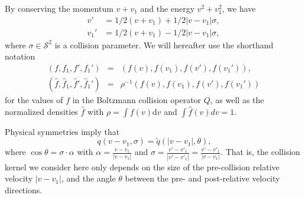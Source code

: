 \documentclass[12pt]{amsart}
\newcommand{\cS}{\mathcal S} \newcommand{\cT}{\mathcal T}
\newcommand{\rd}{\mathrm{d}}
\begin{document}
By conserving the momentum $v+v_1$ and the energy $v^2 + v_1^2$, we have
\begin{equation}\label{BoltzmannSolution}
\begin{split}
v' &= 1/2 (v+v_1) + 1/2 |v-v_1| \sigma,  \\
v_1'&=1/2 (v+v_1) - 1/2  |v-v_1| \sigma,
\end{split}
\end{equation}
where $\sigma \in \cS^2$ is a collision parameter. We will hereafter use the shorthand notation 
\begin{eqnarray*}%
 (f, f_1, f', f_1') &=&  (  f(v), f(v_1), f(v'), f(v_1') ), \\
 (\hat f, \hat f_1,\hat f',  \hat f_1') &=&  \rho^{-1}(  f(v), f(v_1), f(v'), f(v_1') )
\end{eqnarray*}
for the values of $f$ in the Boltzmann collision operator $Q$, as well as the normalized densities $\hat f$ with $\rho = \int f(v) \rd v$ and $\int \hat f(v) dv=1$.


Physical symmetries imply that
\begin{equation}~\label{eq:GeneralKernel}
    q(v-v_1,\sigma) =  \tilde q(|v-v_1|,\theta),
\end{equation}
where $\cos \theta = \sigma\cdot \alpha$ with $\alpha = \frac{v-v_1}{|v-v_1|}$ and $\sigma = \frac{v'-v'_1}{|v'-v'_1|} = \frac{v'-v'_1}{|v-v_1|}$. That is, the collision kernel we consider here only depends on the size of the pre-collision relative velocity $|v-v_1|$, and the angle $\theta$ between the pre- and post-relative velocity directions.
\end{document}
